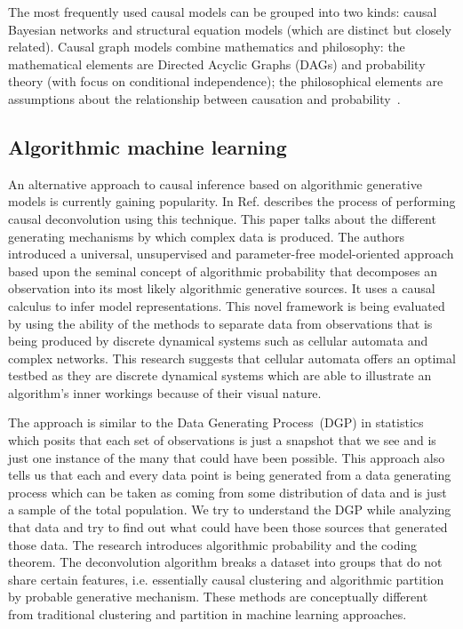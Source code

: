 \documentclass[
 aps,
 jmp,
 amsmath,amssymb,
 reprint,
]{revtex4-2}
\begin{document}
The most frequently used causal models can be grouped into two kinds: causal Bayesian networks and structural equation models (which are distinct but closely related). %
Causal graph models combine mathematics and philosophy: the mathematical elements are Directed Acyclic Graphs (DAGs) and probability theory (with focus on conditional independence); the philosophical elements are assumptions about the relationship between causation and probability~\cite{spirtes2000causation}. %

\subsection{Algorithmic machine learning}

An alternative approach to causal inference based on algorithmic generative models is currently gaining popularity. In 
Ref.\cite{zenil2019causal} describes the process of performing causal deconvolution using this technique.
This paper talks about the different generating mechanisms by which complex data is produced. 
The authors introduced a universal, unsupervised and parameter-free model-oriented approach based upon the seminal concept of algorithmic probability that decomposes an observation into its most likely algorithmic generative sources. 
It uses a causal calculus to infer model representations. 
This novel framework is being evaluated by using the ability of the methods to separate data from observations that is being produced by discrete dynamical systems such as cellular automata and complex networks.
This research suggests that cellular automata offers an optimal testbed as they are discrete dynamical systems which are able to illustrate an algorithm's inner workings because of their visual nature. 

The approach is similar to the Data Generating Process~(DGP) in statistics which posits that each set of observations is just a snapshot that we see and is just one instance of the many that could have been possible. 
This approach also tells us that each and every data point is being generated from a data generating process which can be taken as coming from some distribution of data and is just a sample of the total population. 
We try to understand the DGP while analyzing that data and try to find out what could have been those sources that generated those data.
The research introduces algorithmic probability and the coding theorem. 
The deconvolution algorithm breaks a dataset into groups that do not share certain features, i.e. essentially causal clustering and algorithmic partition by probable generative mechanism.
These methods are conceptually different from traditional clustering and partition in machine learning approaches.
\end{document}
